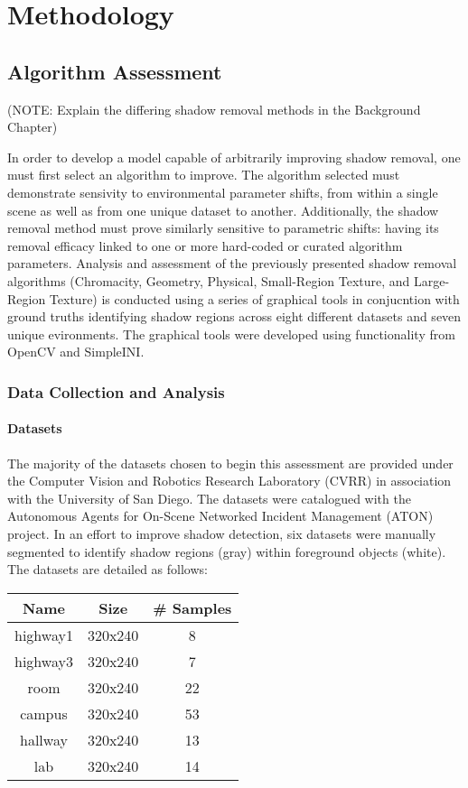 \documentclass[12pt]{report}
\begin{document}
\doublespacing

\clearpage
\chapter{Methodology}

\section{Algorithm Assessment}

(NOTE: Explain the differing shadow removal methods in the Background Chapter)

In order to develop a model capable of arbitrarily improving shadow removal, one must first select an algorithm to improve. The algorithm selected must demonstrate sensivity to environmental parameter shifts, from within a single scene as well as from one unique dataset to another. Additionally, the shadow removal method must prove similarly sensitive to parametric shifts: having its removal efficacy linked to one or more hard-coded or curated algorithm parameters. Analysis and assessment of the previously presented shadow removal algorithms (Chromacity, Geometry, Physical, Small-Region Texture, and Large-Region Texture) is conducted using a series of graphical tools in conjucntion with ground truths identifying shadow regions across eight different datasets and seven unique evironments. The graphical tools were developed using functionality from OpenCV and SimpleINI.

\subsection{Data Collection and Analysis}
\subsubsection{Datasets}
The majority of the datasets chosen to begin this assessment are provided under the Computer Vision and Robotics Research Laboratory (CVRR) in association with the University of San Diego. The datasets were catalogued with the Autonomous Agents for On-Scene Networked Incident Management (ATON) project. In an effort to improve shadow detection, six datasets were manually segmented to identify shadow regions (gray) within foreground objects (white). The datasets are detailed as follows:

\begin{center}
\begin{tabular}{ |c|c|c| }
	\hline
	\textbf{Name} & \textbf{Size} & \textbf{\# Samples} \\
	\hline
	\hline
	highway1 & 320x240 & 8 \\
	\hline 
	highway3 & 320x240 & 7 \\ 
	\hline
	room & 320x240 & 22 \\ 
	\hline
	campus & 320x240 & 53 \\ 
	\hline
	hallway & 320x240 & 13 \\
	\hline
	lab & 320x240 & 14 \\ 
	\hline
\end{tabular}
\end{center}
\end{document}

